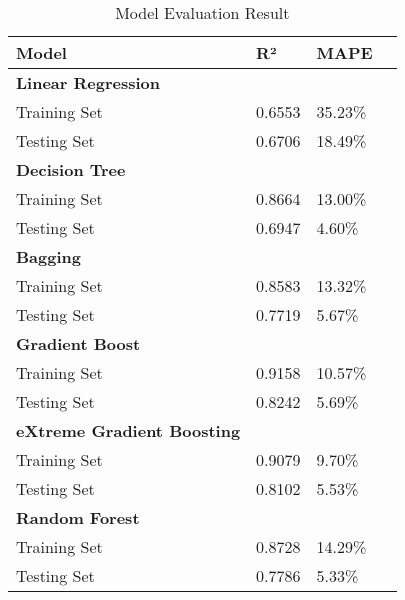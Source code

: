 \documentclass[conference]{IEEEtran}
\begin{document}
    \begin{table}[h]
        \centering
        \renewcommand{\arraystretch}{1.1}
        \begin{tabular}{
            | p{}
            | p{}
            | p{} |
            | p{}
            }
            \hline
            \textbf{Model} & \textbf{R²} & \textbf{MAPE} \\
            \hline
            \multicolumn{1}{|l}{\textbf{Linear Regression}} \\
            \hline
            Training Set   & 0.6553 & 35.23\% \\
            \hline
            Testing Set & 0.6706 & 18.49\% \\
            \hline
            \multicolumn{1}{|l}{\textbf{Decision Tree}}\\
            \hline
            Training Set & 0.8664 & 13.00\% \\
            \hline
            Testing Set & 0.6947 & 4.60\%\\
            \hline
            \multicolumn{1}{|l}{\textbf{Bagging}} \\
            \hline
            Training Set & 0.8583 & 13.32\% \\
            \hline
            Testing Set & 0.7719 & 5.67\% \\
            \hline
            \multicolumn{1}{|l}{\textbf{Gradient Boost}}\\
            \hline
            Training Set & 0.9158 & 10.57\% \\
            \hline
            Testing Set & 0.8242 & 5.69\% \\
            \hline
            \multicolumn{1}{|l}{\textbf{eXtreme Gradient Boosting}}\\
            \hline
            Training Set & 0.9079 & 9.70\% \\
            \hline
            Testing Set & 0.8102 & 5.53\%\\
            \hline
            \multicolumn{1}{|l}{\textbf{Random Forest}}\\
            \hline
            Training Set & 0.8728 & 14.29\% \\
            \hline
            Testing Set & 0.7786 & 5.33\% \\
            \hline
        \end{tabular}
    \caption{Model Evaluation Result}
    \end{table}
\end{document}
